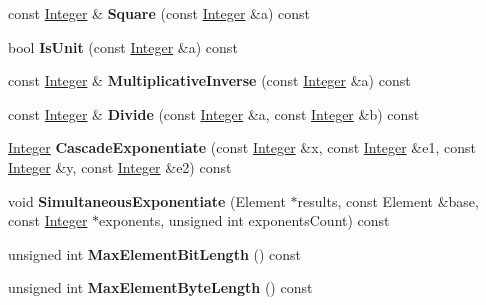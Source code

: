 \begin{DoxyCompactItemize}
\item 
\hypertarget{class_modular_arithmetic_ac378a2527fe2107d3379bc35d7cd0487}{
const \hyperlink{class_integer}{Integer} \& {\bfseries Square} (const \hyperlink{class_integer}{Integer} \&a) const }
\label{class_modular_arithmetic_ac378a2527fe2107d3379bc35d7cd0487}

\item 
\hypertarget{class_modular_arithmetic_a90ca6f6591e3e5553dc7b9e94dad100d}{
bool {\bfseries IsUnit} (const \hyperlink{class_integer}{Integer} \&a) const }
\label{class_modular_arithmetic_a90ca6f6591e3e5553dc7b9e94dad100d}

\item 
\hypertarget{class_modular_arithmetic_ae2246ad602514e19f1291cd46b351ed9}{
const \hyperlink{class_integer}{Integer} \& {\bfseries MultiplicativeInverse} (const \hyperlink{class_integer}{Integer} \&a) const }
\label{class_modular_arithmetic_ae2246ad602514e19f1291cd46b351ed9}

\item 
\hypertarget{class_modular_arithmetic_af9c4550655ec60ea34480060f56061b0}{
const \hyperlink{class_integer}{Integer} \& {\bfseries Divide} (const \hyperlink{class_integer}{Integer} \&a, const \hyperlink{class_integer}{Integer} \&b) const }
\label{class_modular_arithmetic_af9c4550655ec60ea34480060f56061b0}

\item 
\hypertarget{class_modular_arithmetic_a39c4f7a3fb501adc8d96145aecfb63f0}{
\hyperlink{class_integer}{Integer} {\bfseries CascadeExponentiate} (const \hyperlink{class_integer}{Integer} \&x, const \hyperlink{class_integer}{Integer} \&e1, const \hyperlink{class_integer}{Integer} \&y, const \hyperlink{class_integer}{Integer} \&e2) const }
\label{class_modular_arithmetic_a39c4f7a3fb501adc8d96145aecfb63f0}

\item 
\hypertarget{class_modular_arithmetic_ae37f29d8031840d185935819318f90dd}{
void {\bfseries SimultaneousExponentiate} (Element $\ast$results, const Element \&base, const \hyperlink{class_integer}{Integer} $\ast$exponents, unsigned int exponentsCount) const }
\label{class_modular_arithmetic_ae37f29d8031840d185935819318f90dd}

\item 
\hypertarget{class_modular_arithmetic_a9d60d15f789a4f3ebd3329fefc77500e}{
unsigned int {\bfseries MaxElementBitLength} () const }
\label{class_modular_arithmetic_a9d60d15f789a4f3ebd3329fefc77500e}

\item 
\hypertarget{class_modular_arithmetic_a36b7eb53ab95d5ecafc3039fdcfa9077}{
unsigned int {\bfseries MaxElementByteLength} () const }
\label{class_modular_arithmetic_a36b7eb53ab95d5ecafc3039fdcfa9077}


\end{DoxyCompactItemize}
